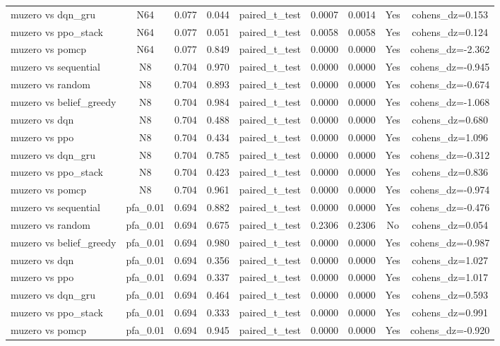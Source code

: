 \begin{table}[htbp]
\begin{tabular}{lcccccccc}
muzero vs dqn_gru & N64 & 0.077 & 0.044 & paired_t_test & 0.0007 & 0.0014 & Yes & cohens_dz=0.153 \\
muzero vs ppo_stack & N64 & 0.077 & 0.051 & paired_t_test & 0.0058 & 0.0058 & Yes & cohens_dz=0.124 \\
muzero vs pomcp & N64 & 0.077 & 0.849 & paired_t_test & 0.0000 & 0.0000 & Yes & cohens_dz=-2.362 \\
muzero vs sequential & N8 & 0.704 & 0.970 & paired_t_test & 0.0000 & 0.0000 & Yes & cohens_dz=-0.945 \\
muzero vs random & N8 & 0.704 & 0.893 & paired_t_test & 0.0000 & 0.0000 & Yes & cohens_dz=-0.674 \\
muzero vs belief_greedy & N8 & 0.704 & 0.984 & paired_t_test & 0.0000 & 0.0000 & Yes & cohens_dz=-1.068 \\
muzero vs dqn & N8 & 0.704 & 0.488 & paired_t_test & 0.0000 & 0.0000 & Yes & cohens_dz=0.680 \\
muzero vs ppo & N8 & 0.704 & 0.434 & paired_t_test & 0.0000 & 0.0000 & Yes & cohens_dz=1.096 \\
muzero vs dqn_gru & N8 & 0.704 & 0.785 & paired_t_test & 0.0000 & 0.0000 & Yes & cohens_dz=-0.312 \\
muzero vs ppo_stack & N8 & 0.704 & 0.423 & paired_t_test & 0.0000 & 0.0000 & Yes & cohens_dz=0.836 \\
muzero vs pomcp & N8 & 0.704 & 0.961 & paired_t_test & 0.0000 & 0.0000 & Yes & cohens_dz=-0.974 \\
muzero vs sequential & pfa_0.01 & 0.694 & 0.882 & paired_t_test & 0.0000 & 0.0000 & Yes & cohens_dz=-0.476 \\
muzero vs random & pfa_0.01 & 0.694 & 0.675 & paired_t_test & 0.2306 & 0.2306 & No & cohens_dz=0.054 \\
muzero vs belief_greedy & pfa_0.01 & 0.694 & 0.980 & paired_t_test & 0.0000 & 0.0000 & Yes & cohens_dz=-0.987 \\
muzero vs dqn & pfa_0.01 & 0.694 & 0.356 & paired_t_test & 0.0000 & 0.0000 & Yes & cohens_dz=1.027 \\
muzero vs ppo & pfa_0.01 & 0.694 & 0.337 & paired_t_test & 0.0000 & 0.0000 & Yes & cohens_dz=1.017 \\
muzero vs dqn_gru & pfa_0.01 & 0.694 & 0.464 & paired_t_test & 0.0000 & 0.0000 & Yes & cohens_dz=0.593 \\
muzero vs ppo_stack & pfa_0.01 & 0.694 & 0.333 & paired_t_test & 0.0000 & 0.0000 & Yes & cohens_dz=0.991 \\
muzero vs pomcp & pfa_0.01 & 0.694 & 0.945 & paired_t_test & 0.0000 & 0.0000 & Yes & cohens_dz=-0.920 \\

\end{tabular}
\end{table}
